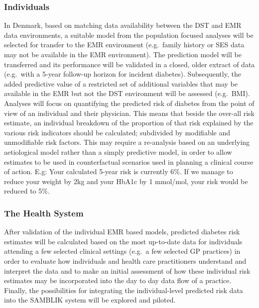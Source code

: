\documentclass[11pt]{article}
\begin{document}
\subsubsection{Individuals}
\label{sec:org2fd81ef}
In Denmark, based on matching data availability between the DST and EMR data environments, a suitable
model from the population focused analyses will be selected for transfer to the EMR environment
(e.g. family history or SES data may not be available in the EMR environment). The prediction model
will be transferred and its performance will be validated in a closed, older extract of data
(e.g. with a 5-year follow-up horizon for incident diabetes). Subsequently, the added predictive
value of a restricted set of additional variables that may be available in the EMR but not the DST
environment will be assessed (e.g. BMI). Analyses will focus on quantifying the predicted risk of
diabetes from the point of view of an individual and their physician. This means that beside the
over-all risk estimate, an individual breakdown of the proportion of that risk explained by the
various risk indicators should be calculated; subdivided by modifiable and unmodifiable risk factors.
This may require a re-analysis based on an underlying aetiological model rather than a simply
predictive model, in order to allow estimates to be used in counterfactual scenarios used in planning
a clinical course of action. E.g: Your calculated 5-year risk is currently 6\%. If we manage to reduce
your weight by 2kg and your HbA1c by 1 mmol/mol, your risk would be reduced to 5\%.

\subsubsection{The Health System}
\label{sec:orgdebda42}
After validation of the individual EMR based models, predicted diabetes risk estimates will be
calculated based on the most up-to-date data for individuals attending a few selected clinical
settings (e.g. a few selected GP practices) in order to evaluate how individuals and health care
practitioners understand and interpret the data and to make an initial assessment of how these
individual risk estimates may be incorporated into the day to day data flow of a practice. Finally,
the possibilities for integrating the individual-level predicted risk data into the SAMBLIK system
will be explored and piloted.
\end{document}
